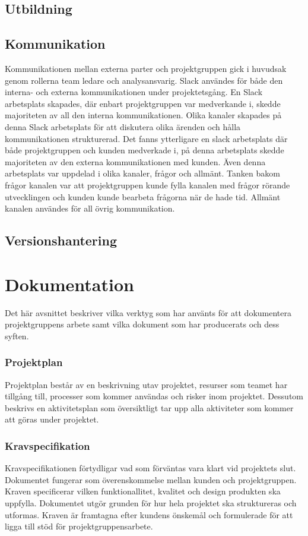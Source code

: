 \subsection{Utbildning}

\subsection{Kommunikation}
Kommunikationen mellan externa parter och projektgruppen gick i huvudsak genom rollerna team ledare och analysansvarig. Slack användes för både den interna- och externa kommunikationen under projektetsgång. En Slack arbetsplats skapades, där enbart projektgruppen var medverkande i, skedde majoriteten av all den interna kommunikationen. Olika kanaler skapades på denna Slack arbetsplats för att diskutera olika ärenden och hålla kommunikationen strukturerad. Det fanns ytterligare en slack arbetsplats där både projektgruppen och kunden medverkade i, på denna arbetsplats skedde majoriteten av den externa kommunikationen med kunden. Även denna arbetsplats var uppdelad i olika kanaler, frågor och allmänt. Tanken bakom frågor kanalen var att projektgruppen kunde fylla kanalen med frågor rörande utvecklingen och kunden kunde bearbeta frågorna när de hade tid. Allmänt kanalen användes för all övrig kommunikation.

\subsection{Versionshantering}

\section{Dokumentation}
Det här avsnittet beskriver vilka verktyg som har använts för att dokumentera projektgruppens arbete samt vilka dokument som har producerats och dess syften.

\subsubsection*{Projektplan}
Projektplan består av en beskrivning utav projektet, 
resurser som teamet har tillgång till, processer som kommer användas och risker inom projektet.
Dessutom beskrivs en aktivitetsplan som översiktligt tar upp alla aktiviteter som kommer att
göras under projektet.

\subsubsection*{Kravspecifikation}
Kravspecifikationen förtydligar vad som förväntas vara klart vid projektets slut. Dokumentet fungerar som överenskommelse mellan kunden och projektgruppen. Kraven specificerar vilken funktionallitet, kvalitet och design produkten ska uppfylla. Dokumentet utgör grunden för hur hela projektet ska struktureras och utformas. Kraven är framtagna efter kundens önskemål och formulerade för att ligga till stöd för projektgruppensarbete.

